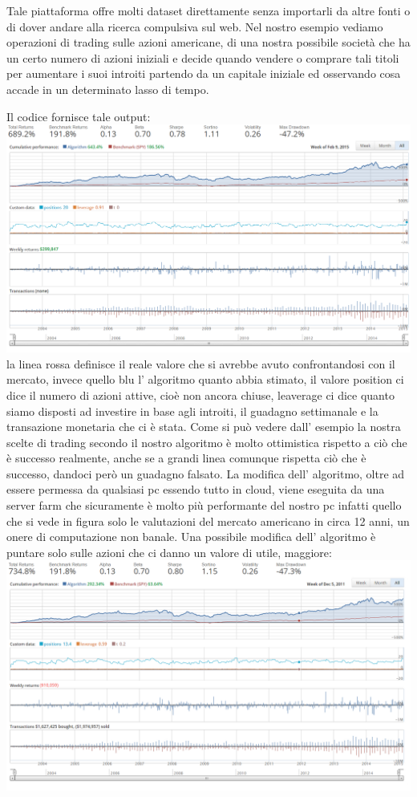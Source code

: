 			\par 
			Tale piattaforma offre molti dataset direttamente senza importarli da altre fonti o di dover andare alla ricerca compulsiva sul web. Nel nostro esempio vediamo operazioni di trading sulle azioni americane, di una nostra possibile società che ha un certo numero di azioni iniziali e decide quando vendere o comprare tali titoli per aumentare i suoi introiti partendo da un capitale iniziale ed osservando cosa accade in un determinato lasso di tempo.
			\par 
			Il codice fornisce tale output:
			\includegraphics[width=1.0\textwidth, height=0.40\textheight]{inizio.png} 
			la linea rossa definisce il reale valore che si avrebbe avuto confrontandosi con il mercato, invece quello blu l' algoritmo quanto abbia stimato, il valore position ci dice il numero di azioni attive, cioè non ancora chiuse, leaverage ci dice quanto siamo disposti ad investire in base agli introiti,%
			il guadagno settimanale e la transazione monetaria che ci è stata.
			Come si può vedere dall' esempio la nostra scelte di trading secondo il nostro algoritmo è molto ottimistica rispetto a ciò che è successo realmente, anche se a grandi linea comunque rispetta ciò che è successo, dandoci però un guadagno falsato.
			La modifica dell' algoritmo, oltre ad essere permessa da qualsiasi pc essendo tutto in cloud, viene eseguita da una server farm che sicuramente è molto più performante del nostro pc infatti quello che si vede in figura solo le valutazioni del mercato americano in circa 12 anni, un onere di computazione non banale.
			Una possibile modifica dell' algoritmo è  puntare solo sulle azioni che ci danno un valore di utile, maggiore:
			\includegraphics[width=1.0\textwidth, height=0.40\textheight]{factorfilter0,1.png} 

